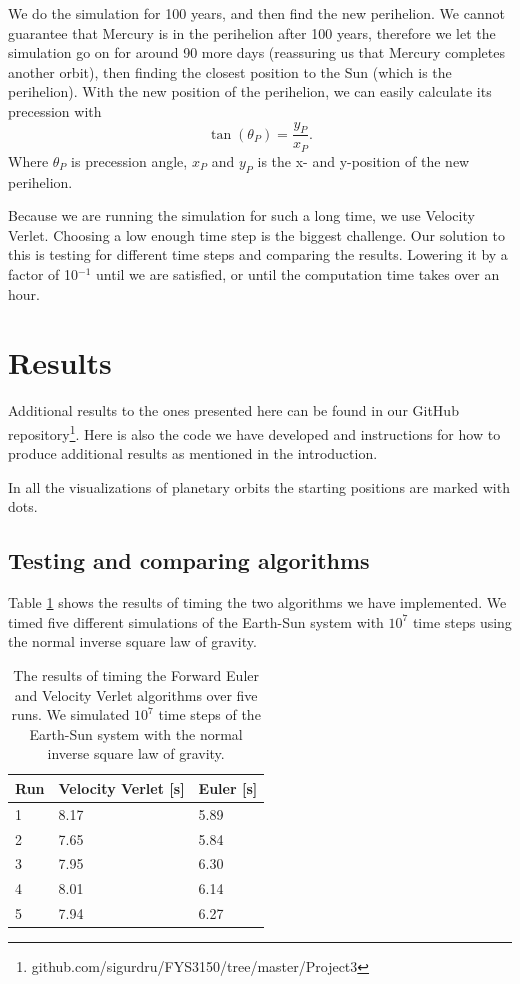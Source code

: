 \documentclass[reprint, english,notitlepage,nofootinbib]{revtex4-1}  %
\begin{document}
We do the simulation for 100 years, and then find the new perihelion. We cannot guarantee that Mercury is in the perihelion after 100 years, therefore we let the simulation go on for around 90 more days (reassuring us that Mercury completes another orbit), then finding the closest position to the Sun (which is the perihelion). With the new position of the perihelion, we can easily calculate its precession with
\begin{equation*}
	\tan(\theta_P) = \frac{y_P}{x_P}.
\end{equation*}
Where $\theta_P$ is precession angle, $x_P$ and $y_P$ is the x- and y-position of the new perihelion.

Because we are running the simulation for such a long time, we use Velocity Verlet. Choosing a low enough time step is the biggest challenge. Our solution to this is testing for different time steps and comparing the results. Lowering it by a factor of 10$^{-1}$ until we are satisfied, or until the computation time takes over an hour.



\section{Results}

Additional results to the ones presented here can be found in our GitHub repository\footnote{github.com/sigurdru/FYS3150/tree/master/Project3}. Here is also the code we have developed and instructions for how to produce additional results as mentioned in the introduction.

In all the visualizations of planetary orbits the starting positions are marked with dots.


\subsection{Testing and comparing algorithms}

Table \ref{tab:timing} shows the results of timing the two algorithms we have implemented. We timed five different simulations of the Earth-Sun system with $10^7$ time steps using the normal inverse square law of gravity.

\begin{table}[]
  \begin{tabular}{|l|l|l|}
    \hline
    Run & Velocity Verlet {[}s{]} & Euler {[}s{]} \\
    \hline
    1   & 8.17                    & 5.89          \\
    2   & 7.65                    & 5.84          \\
    3   & 7.95                    & 6.30          \\
    4   & 8.01                    & 6.14          \\
    5   & 7.94                    & 6.27          \\
    \hline
  \end{tabular}
  \caption{The results of timing the Forward Euler and Velocity Verlet algorithms over five runs. We simulated $10^7$ time steps of the Earth-Sun system with the normal inverse square law of gravity.}
  \label{tab:timing}
\end{table}
\end{document}
